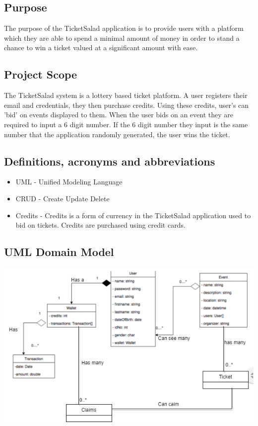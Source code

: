 \documentclass[11pt]{article}
\begin{document}
	\subsection{Purpose}
	The purpose of the TicketSalad application is to provide users with a platform which they are able to spend a minimal amount of money in order to stand a chance to win a ticket valued at a significant amount with ease.
	\subsection{Project Scope}
	The TicketSalad system is a lottery based ticket platform. A user registers their email and credentials, they then purchase credits. Using these credits, user's can 'bid' on events displayed to them. When the user bids on an event they are required to input a 6 digit number. If the 6 digit number they input is the same number that the application randomly generated, the user wins the ticket.
	\subsection{Definitions, acronyms and abbreviations}
	\begin{itemize}
		\item UML - Unified Modeling Language 
		\item CRUD - Create Update Delete
		\item Credits - Credits is a form of currency in the TicketSalad application used to bid on tickets. Credits are purchased using credit cards.
	\end{itemize}
	
	\subsection{UML Domain Model}
	\includegraphics[scale=0.8]{Domain.png}
\end{document}
